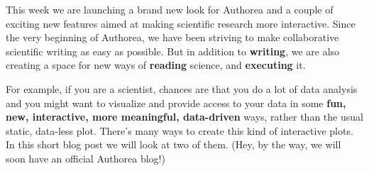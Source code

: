 This week we are launching a brand new look for Authorea and a couple of exciting new features aimed at making scientific research more interactive. Since the very beginning of Authorea, we have been striving to make collaborative scientific writing as easy as possible. But in addition to \textbf{writing}, we are also creating a space for new ways of \textbf{reading} science, and \textbf{executing} it.

For example, if you are a scientist, chances are that you do a lot of data analysis and you might want to visualize and provide access to your data in some \textbf{fun, new, interactive, more meaningful, data-driven} ways, rather than the usual static, data-less plot. There's many ways to create this kind of interactive plots. In this short blog post we will look at two of them. (Hey, by the way, we will soon have an official Authorea blog!)
